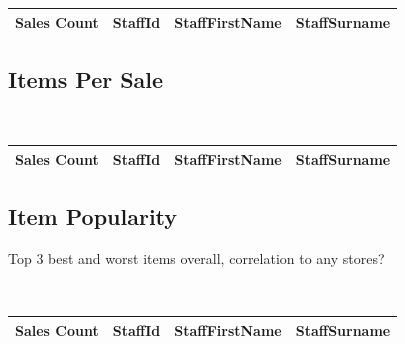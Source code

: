 \documentclass{article}
\begin{document}
                \begin{table}[H]
                    \centering
                    \begin{tabular}{|l|l|l|l|}
                    \hline
                    Sales Count & StaffId & StaffFirstName & StaffSurname \\ \hline
                    \end{tabular}
                    \end{table}           
                    
            \subsection{Items Per Sale}

            \begin{lstlisting}
                
            \end{lstlisting}

            \begin{table}[H]
                \centering
                \begin{tabular}{|l|l|l|l|}
                \hline
                Sales Count & StaffId & StaffFirstName & StaffSurname \\ \hline
                \end{tabular}
                \end{table}

            \subsection{Item Popularity}
                Top 3 best and worst items overall, correlation to any stores?

                \begin{lstlisting}
                   
                \end{lstlisting}

                \begin{table}[H]
                    \centering
                    \begin{tabular}{|l|l|l|l|}
                    \hline
                    Sales Count & StaffId & StaffFirstName & StaffSurname \\ \hline
                    \end{tabular}
                    \end{table}
\end{document}
